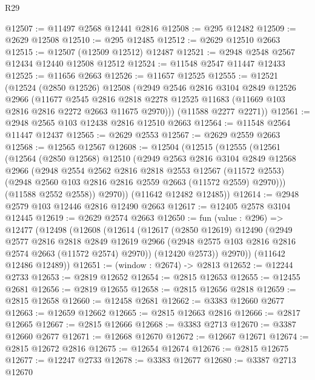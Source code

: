 \begin{lexlean}{R29}
\begin{coremodule}
@12507 := @11497 @2568 @12441 @2816
@12508 := @295 @12482
@12509 := @2629 @12508
@12510 := @295 @12485
@12512 := @2629 @12510 @2663
@12515 := @12507 (@12509 @12512) @12487
@12521 := @2948 @2548 @2567 @12434 @12440 @12508 @12512
@12524 := @11548 @2547 @11447 @12433
@12525 := @11656 @2663
@12526 := @11657 @12525
@12555 := @12521
    (@12524
      (@2850 @12526)
      @12508
      (@2949
        @2546
        @2816
        @3104
        @2849
        @12526
        @2966
        (@11677
          @2545
          @2816
          @2818
          @2278
          @12525
          @11683
          (@11669 @103 @2816 @2816 @2272 @2663 @11675 @2970)))
      (@11588 @2277 @2271))
@12561 := @2948 @2565 @103 @12438 @2816 @12510 @2663
@12564 := @11548 @2564 @11447 @12437
@12565 := @2629 @2553
@12567 := @2629 @2559 @2663
@12568 := @12565 @12567
@12608 := @12504
    (@12515
      (@12555
        (@12561
          (@12564
            (@2850 @12568)
            @12510
            (@2949
              @2563
              @2816
              @3104
              @2849
              @12568
              @2966
              (@2948
                @2554
                @2562
                @2816
                @2818
                @2553
                @12567
                (@11572 @2553)
                (@2948 @2560 @103 @2816 @2816 @2559 @2663 (@11572 @2559) @2970)))
            (@11588 @2552 @2558))
          @2970))
      (@11642 @12482 @12485))
@12614 := @2948 @2579 @103 @12446 @2816 @12490 @2663
@12617 := @12405 @2578 @3104 @12445
@12619 := @2629 @2574 @2663
@12650 := fun (value : @296) =>
  @12477
    (@12498
      (@12608
        (@12614
          (@12617
            (@2850 @12619)
            @12490
            (@2949
              @2577
              @2816
              @2818
              @2849
              @12619
              @2966
              (@2948 @2575 @103 @2816 @2816 @2574 @2663 (@11572 @2574) @2970))
            (@12420 @2573))
          @2970))
      (@11642 @12486 @12489))
@12651 := (window : @2674) -> @2813
@12652 := @12244 @2733
@12653 := @2819 @12652
@12654 := @2815 @12653
@12655 := @12455 @2681
@12656 := @2819 @12655
@12658 := @2815 @12656 @2818
@12659 := @2815 @12658
@12660 := @12458 @2681
@12662 := @3383 @12660 @2677
@12663 := @12659 @12662
@12665 := @2815 @12663 @2816
@12666 := @2817 @12665
@12667 := @2815 @12666
@12668 := @3383 @2713
@12670 := @3387 @12660 @2677
@12671 := @12668 @12670
@12672 := @12667 @12671
@12674 := @2815 @12672 @2816
@12675 := @12654 @12674
@12676 := @2815 @12675
@12677 := @12247 @2733
@12678 := @3383 @12677
@12680 := @3387 @2713 @12670

\end{coremodule}
\end{lexlean}
